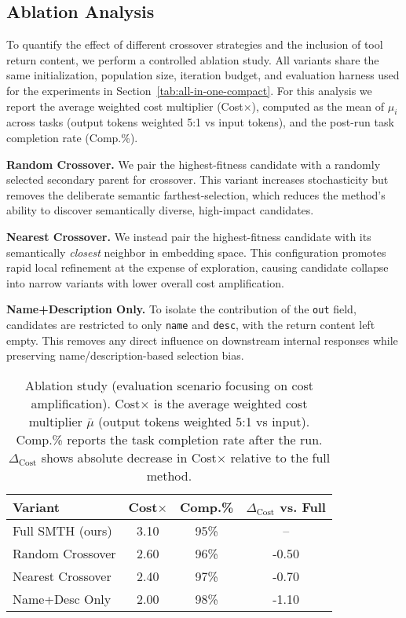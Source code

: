\subsection{Ablation Analysis}
To quantify the effect of different crossover strategies and the inclusion of tool return content,
we perform a controlled ablation study. All variants share the same initialization, population size,
iteration budget, and evaluation harness used for the experiments in Section~\ref{tab:all-in-one-compact}.
For this analysis we report the average weighted cost multiplier (Cost$\times$), computed as the mean of
$\mu_i$ across tasks (output tokens weighted 5:1 vs input tokens), and the post-run task completion rate (Comp.\%).

\textbf{Random Crossover.}
We pair the highest-fitness candidate with a randomly selected secondary parent for crossover.
This variant increases stochasticity but removes the deliberate semantic farthest-selection,
which reduces the method's ability to discover semantically diverse, high-impact candidates.

\textbf{Nearest Crossover.}
We instead pair the highest-fitness candidate with its semantically \emph{closest} neighbor in embedding space.
This configuration promotes rapid local refinement at the expense of exploration, causing candidate collapse
into narrow variants with lower overall cost amplification.

\textbf{Name+Description Only.}
To isolate the contribution of the \texttt{out} field, candidates are restricted to only \texttt{name} and \texttt{desc},
with the return content left empty. This removes any direct influence on downstream internal responses while
preserving name/description-based selection bias.

\begin{table}[t]
\centering
\small
\begin{tabular}{lccc}
\toprule
\textbf{Variant} & \textbf{Cost$\times$} & \textbf{Comp.\%} & $\Delta_{\text{Cost}}$ vs. Full \\
\midrule
Full SMTH (ours)      & 3.10 & 95\% & -- \\
Random Crossover       & 2.60 & 96\% & -0.50 \\
Nearest Crossover      & 2.40 & 97\% & -0.70 \\
Name+Desc Only         & 2.00 & 98\% & -1.10 \\
\bottomrule
\end{tabular}
\caption{
Ablation study (evaluation scenario focusing on cost amplification).
Cost$\times$ is the average weighted cost multiplier $\bar\mu$ (output tokens weighted 5:1 vs input).
Comp.\% reports the task completion rate after the run.
$\Delta_{\text{Cost}}$ shows absolute decrease in Cost$\times$ relative to the full method.
}
\label{tab:ablation_costs}
\end{table}


